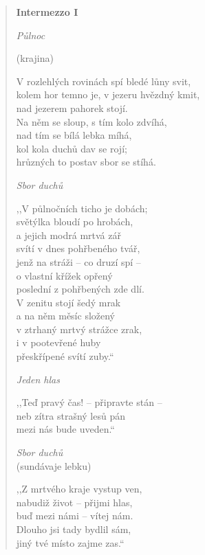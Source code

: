 \begin{verse}
\textbf{Intermezzo I}

\textit{Půlnoc}

\smallskip

(krajina)

\smallskip

V rozlehlých rovinách spí bledé lůny svit, \\
kolem hor temno je, v jezeru hvězdný kmit, \\
nad jezerem pahorek stojí. \\
Na něm se sloup, s tím kolo zdvíhá, \\
nad tím se bílá lebka míhá, \\
kol kola duchů dav se rojí; \\
hrůzných to postav sbor se stíhá.

\smallskip

\textit{Sbor duchů}

\smallskip

,,V půlnočních ticho je dobách; \\
světýlka bloudí po hrobách, \\
a jejich modrá mrtvá zář \\
svítí v dnes pohřbeného tvář, \\
jenž na stráži -- co druzí spí -- \\
o vlastní křížek opřený \\
poslední z pohřbených zde dlí. \\
V zenitu stojí šedý mrak \\
a na něm měsíc složený \\
v ztrhaný mrtvý strážce zrak, \\
i v pootevřené huby \\
přeskřípené svítí zuby.``

\smallskip

\textit{Jeden hlas}

\smallskip

,,Teď pravý čas! -- připravte stán -- \\
neb zítra strašný lesů pán \\
mezi nás bude uveden.`` 

\smallskip

\textit{Sbor duchů} \\
(sundávaje lebku)

\smallskip

,,Z mrtvého kraje vystup ven, \\
nabudiž život -- přijmi hlas, \\
buď mezi námi -- vítej nám. \\
Dlouho jsi tady bydlil sám, \\
jiný tvé místo zajme zas.``


\end{verse}
